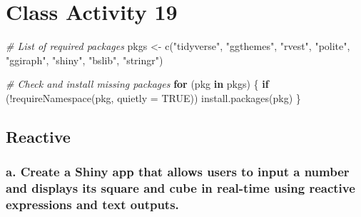 \documentclass[
]{book}
\newenvironment{Shaded}{\begin{snugshade}}{\end{snugshade}}
\newcommand{\AttributeTok}[1]{\textcolor[rgb]{0.77,0.63,0.00}{#1}}
\newcommand{\CommentTok}[1]{\textcolor[rgb]{0.56,0.35,0.01}{\textit{#1}}}
\newcommand{\ConstantTok}[1]{\textcolor[rgb]{0.00,0.00,0.00}{#1}}
\newcommand{\ControlFlowTok}[1]{\textcolor[rgb]{0.13,0.29,0.53}{\textbf{#1}}}
\newcommand{\FunctionTok}[1]{\textcolor[rgb]{0.00,0.00,0.00}{#1}}
\newcommand{\NormalTok}[1]{#1}
\newcommand{\OtherTok}[1]{\textcolor[rgb]{0.56,0.35,0.01}{#1}}
\newcommand{\SpecialCharTok}[1]{\textcolor[rgb]{0.00,0.00,0.00}{#1}}
\newcommand{\StringTok}[1]{\textcolor[rgb]{0.31,0.60,0.02}{#1}}
\begin{document}
\hypertarget{class-activity-19}{%
\chapter{Class Activity 19}\label{class-activity-19}}

\begin{Shaded}
\begin{Highlighting}[]
\CommentTok{\# List of required packages}
\NormalTok{pkgs }\OtherTok{\textless{}{-}} \FunctionTok{c}\NormalTok{(}\StringTok{"tidyverse"}\NormalTok{, }\StringTok{"ggthemes"}\NormalTok{, }\StringTok{"rvest"}\NormalTok{, }\StringTok{"polite"}\NormalTok{, }\StringTok{"ggiraph"}\NormalTok{, }\StringTok{"shiny"}\NormalTok{, }\StringTok{"bslib"}\NormalTok{, }\StringTok{"stringr"}\NormalTok{)}

\CommentTok{\# Check and install missing packages}
\ControlFlowTok{for}\NormalTok{ (pkg }\ControlFlowTok{in}\NormalTok{ pkgs) \{}
  \ControlFlowTok{if}\NormalTok{ (}\SpecialCharTok{!}\FunctionTok{requireNamespace}\NormalTok{(pkg, }\AttributeTok{quietly =} \ConstantTok{TRUE}\NormalTok{)) }
    \FunctionTok{install.packages}\NormalTok{(pkg)}
\NormalTok{\}}
\end{Highlighting}
\end{Shaded}

\hypertarget{reactive}{%
\section{Reactive}\label{reactive}}

\hypertarget{a.-create-a-shiny-app-that-allows-users-to-input-a-number-and-displays-its-square-and-cube-in-real-time-using-reactive-expressions-and-text-outputs.}{%
\subsection{a. Create a Shiny app that allows users to input a number and displays its square and cube in real-time using reactive expressions and text outputs.}\label{a.-create-a-shiny-app-that-allows-users-to-input-a-number-and-displays-its-square-and-cube-in-real-time-using-reactive-expressions-and-text-outputs.}}
\end{document}
